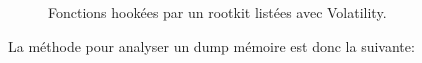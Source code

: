 \begin{figure}
    \centering
    \caption{Fonctions hookées par un rootkit listées avec Volatility.}
    \label{fig:volatility-rootkit}
\end{figure}

La méthode pour analyser un dump mémoire est donc la suivante: \cite{13}

